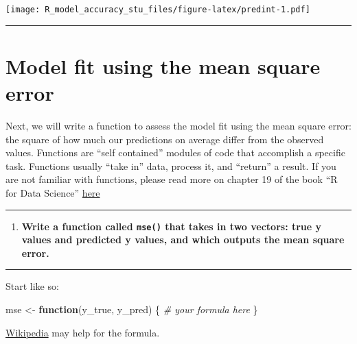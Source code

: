 \documentclass[
  12pt,
]{article}
\newenvironment{Shaded}{\begin{snugshade}}{\end{snugshade}}
\newcommand{\CommentTok}[1]{\textcolor[rgb]{0.56,0.35,0.01}{\textit{#1}}}
\newcommand{\ControlFlowTok}[1]{\textcolor[rgb]{0.13,0.29,0.53}{\textbf{#1}}}
\newcommand{\NormalTok}[1]{#1}
\newcommand{\OtherTok}[1]{\textcolor[rgb]{0.56,0.35,0.01}{#1}}
\providecommand{\tightlist}{%
  \setlength{\itemsep}{0pt}\setlength{\parskip}{0pt}}
\begin{document}
\texttt{[image: R\_model\_accuracy\_stu\_files/figure-latex/predint-1.pdf]}

\begin{center}\rule{0.5\linewidth}{0.5pt}\end{center}

\hypertarget{model-fit-using-the-mean-square-error}{%
\section{Model fit using the mean square
error}\label{model-fit-using-the-mean-square-error}}

Next, we will write a function to assess the model fit using the mean
square error: the square of how much our predictions on average differ
from the observed values. Functions are ``self contained'' modules of
code that accomplish a specific task. Functions usually ``take in''
data, process it, and ``return'' a result. If you are not familiar with
functions, please read more on chapter 19 of the book ``R for Data
Science'' \href{https://r4ds.had.co.nz/functions.html}{here}

\begin{center}\rule{0.5\linewidth}{0.5pt}\end{center}

\begin{enumerate}
\def\labelenumi{\arabic{enumi}.}
\setcounter{enumi}{9}
\tightlist
\item
  \textbf{Write a function called \texttt{mse()} that takes in two
  vectors: true y values and predicted y values, and which outputs the
  mean square error.}
\end{enumerate}

\begin{center}\rule{0.5\linewidth}{0.5pt}\end{center}

Start like so:

\begin{Shaded}
\begin{Highlighting}[]
\NormalTok{mse }\OtherTok{\textless{}{-}} \ControlFlowTok{function}\NormalTok{(y\_true, y\_pred) \{}
  \CommentTok{\# your formula here}
\NormalTok{\}}
\end{Highlighting}
\end{Shaded}

\href{https://en.wikipedia.org/w/index.php?title=Mean_squared_error\&oldid=857685443}{Wikipedia}
may help for the formula.
\end{document}
